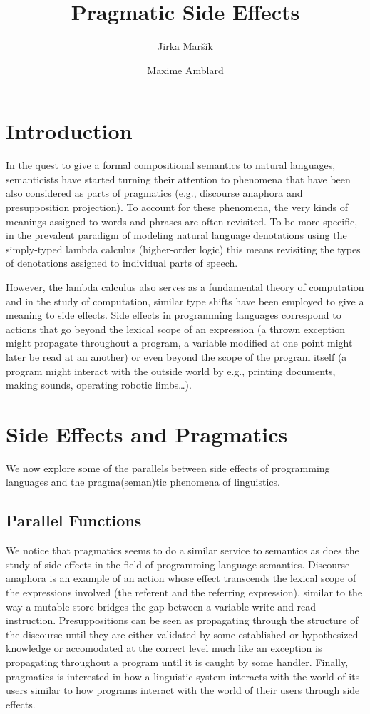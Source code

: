 \documentclass[a4paper,11pt]{article}
\title{Pragmatic Side Effects}
\author{Jirka Maršík \and Maxime Amblard}
\begin{document}
\maketitle

\section{Introduction}

In the quest to give a formal compositional semantics to natural languages,
semanticists have started turning their attention to phenomena that have
been also considered as parts of pragmatics (e.g., discourse anaphora and
presupposition projection). To account for these phenomena, the very kinds
of meanings assigned to words and phrases are often revisited. To be more
specific, in the prevalent paradigm of modeling natural language
denotations using the simply-typed lambda calculus (higher-order logic)
this means revisiting the types of denotations assigned to individual parts
of speech.

However, the lambda calculus also serves as a fundamental theory of
computation and in the study of computation, similar type shifts have been
employed to give a meaning to side effects. Side effects in programming
languages correspond to actions that go beyond the lexical scope of an
expression (a thrown exception might propagate throughout a program, a
variable modified at one point might later be read at an another) or even
beyond the scope of the program itself (a program might interact with the
outside world by e.g., printing documents, making sounds, operating robotic
limbs\ldots).

\section{Side Effects and Pragmatics}

We now explore some of the parallels between side effects of programming
languages and the pragma(seman)tic phenomena of linguistics.

\subsection{Parallel Functions}

We notice that pragmatics seems to do a similar service to semantics as
does the study of side effects in the field of programming language
semantics. Discourse anaphora is an example of an action whose effect
transcends the lexical scope of the expressions involved (the referent and
the referring expression), similar to the way a mutable store bridges the
gap between a variable write and read instruction. Presuppositions can be
seen as propagating through the structure of the discourse until they are
either validated by some established or hypothesized knowledge or
accomodated at the correct level much like an exception is propagating
throughout a program until it is caught by some handler. Finally,
pragmatics is interested in how a linguistic system interacts with the
world of its users similar to how programs interact with the world of their
users through side effects.
\end{document}
